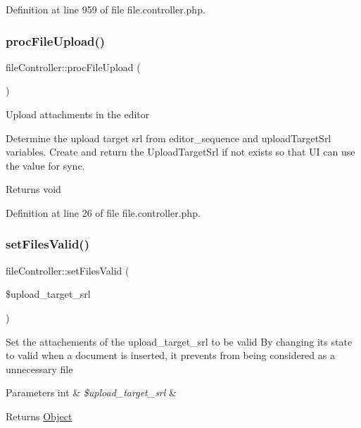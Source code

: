 Definition at line 959 of file file.\+controller.\+php.

\hypertarget{classfileController_a149fa7253922771172674963f700c2d6}{}\label{classfileController_a149fa7253922771172674963f700c2d6} 
\subsubsection{\texorpdfstring{proc\+File\+Upload()}{procFileUpload()}}
{\footnotesize\ttfamily file\+Controller\+::proc\+File\+Upload (\begin{DoxyParamCaption}{ }\end{DoxyParamCaption})}

Upload attachments in the editor

Determine the upload target srl from editor\+\_\+sequence and upload\+Target\+Srl variables. Create and return the Upload\+Target\+Srl if not exists so that UI can use the value for sync.

\begin{DoxyReturn}{Returns}
void 
\end{DoxyReturn}


Definition at line 26 of file file.\+controller.\+php.

\hypertarget{classfileController_a801efe17bf09b43279f82504b748c5ee}{}\label{classfileController_a801efe17bf09b43279f82504b748c5ee} 
\subsubsection{\texorpdfstring{set\+Files\+Valid()}{setFilesValid()}}
{\footnotesize\ttfamily file\+Controller\+::set\+Files\+Valid (\begin{DoxyParamCaption}\item[{}]{\$upload\+\_\+target\+\_\+srl }\end{DoxyParamCaption})}

Set the attachements of the upload\+\_\+target\+\_\+srl to be valid By changing its state to valid when a document is inserted, it prevents from being considered as a unnecessary file


\begin{DoxyParams}[1]{Parameters}
int & {\em \$upload\+\_\+target\+\_\+srl} & \\
\hline
\end{DoxyParams}
\begin{DoxyReturn}{Returns}
\hyperlink{classObject}{Object} 
\end{DoxyReturn}


